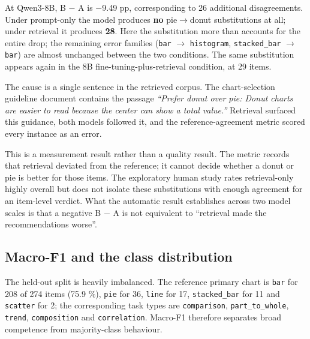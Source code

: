 At Qwen3-8B, B \ensuremath{-} A is \ensuremath{-}9.49 pp, corresponding to 26 additional disagreements. Under prompt-only the model produces \textbf{no} pie\(\rightarrow\)donut substitutions at all; under retrieval it produces \textbf{28}. Here the substitution more than accounts for the entire drop; the remaining error families (\texttt{bar} \(\rightarrow\) \texttt{histogram}, \texttt{stacked\_bar} \(\rightarrow\) \texttt{bar}) are almost unchanged between the two conditions. The same substitution appears again in the 8B fine-tuning-plus-retrieval condition, at 29 items.

The cause is a single sentence in the retrieved corpus. The chart-selection guideline document contains the passage \emph{``Prefer donut over pie: Donut charts are easier to read because the center can show a total value.''} Retrieval surfaced this guidance, both models followed it, and the reference-agreement metric scored every instance as an error.

This is a measurement result rather than a quality result. The metric records that retrieval deviated from the reference; it cannot decide whether a donut or pie is better for those items. The exploratory human study rates retrieval-only highly overall but does not isolate these substitutions with enough agreement for an item-level verdict. What the automatic result establishes across two model scales is that a negative B \ensuremath{-} A is not equivalent to ``retrieval made the recommendations worse''.

\subsection{Macro-F1 and the class distribution}

The held-out split is heavily imbalanced. The reference primary chart is \texttt{bar} for 208 of 274 items (75.9 \%), \texttt{pie} for 36, \texttt{line} for 17, \texttt{stacked\_bar} for 11 and \texttt{scatter} for 2; the corresponding task types are \texttt{comparison}, \texttt{part\_to\_whole}, \texttt{trend}, \texttt{composition} and \texttt{correlation}. Macro-F1 therefore separates broad competence from majority-class behaviour.

